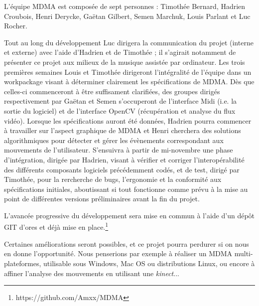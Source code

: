 \par L'équipe MDMA est composée de sept personnes : Timothée Bernard, Hadrien Croubois, Henri Derycke, Gaëtan Gilbert, Semen Marchuk, Louis Parlant et Luc Rocher.
\par Tout au long du développement Luc dirigera la communication du projet (interne et externe) avec l'aide d'Hadrien et de Timothée ; il s'agirait notamment de présenter ce projet aux milieux de la musique assistée par ordinateur. Les trois premières semaines Louis et Timothée dirigeront l'intégralité de l'équipe dans un workpackage visant à déterminer clairement les  spécifications de MDMA. Dès que celles-ci commenceront à être  suffisament clarifiées, des groupes dirigés respectivement par Gaëtan et Semen s'occuperont de l'interface Midi (i.e. la sortie du logiciel) et de l'interface OpenCV (récupération et analyse du flux vidéo). Lorsque les spécifications auront été données, Hadrien pourra commencer à  travailler sur l'aspect graphique de MDMA et Henri cherchera des solutions algorithmiques pour détecter et gérer les évènements correspondant aux mouvements de l'utilisateur. S'ensuivra à partir de mi-novembre une phase d'intégration, dirigée par Hadrien, visant à  vérifier et corriger l'interopérabilité des différents composants logiciels précédemment codés, et de test, dirigé par Timothée, pour la rercherche de bugs, l'ergonomie et la conformité aux spécifications initiales, aboutissant si tout fonctionne comme prévu à la mise au point de différentes versions préliminaires avant la fin du projet.
\par L'avancée progressive du développement sera mise en commun à l'aide d'un dépôt GIT d'ores et déjà mise en place.\footnote{https://github.com/Amxx/MDMA}
\par Certaines améliorations seront possibles, et ce projet pourra perdurer si on nous en donne l'opportunité. Nous penserions par exemple à réaliser un MDMA multi-plateformes, utilisable sous Windows, Mac OS ou distributions Linux, ou encore à affiner l'analyse des mouvements en utilisant une \emph{kinect}...

